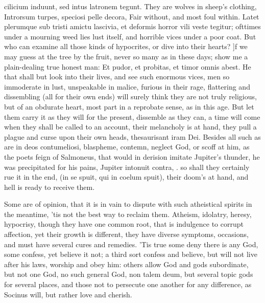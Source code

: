 {cilicium induunt, sed intus latronem tegunt. They are wolves in sheep's
clothing, Introrsum turpes, speciosi pelle decora, Fair without, and
most foul within. Latet plerumque sub tristi amictu lascivia, et
deformis horror vili veste tegitur; ofttimes under a mourning weed lies
lust itself, and horrible vices under a poor coat. But who can examine
all those kinds of hypocrites, or dive into their hearts? ]f we may
guess at the tree by the fruit, never so many as in these days; show me
a plain-dealing true honest man: Et pudor, et probitas, et timor omnis
abest. He that shall but look into their lives, and see such enormous
vices, men so immoderate in lust, unspeakable in malice, furious in
their rage, flattering and dissembling (all for their own ends) will
surely think they are not truly religious, but of an obdurate heart,
most part in a reprobate sense, as in this age. But let them carry it
as they will for the present, dissemble as they can, a time will come
when they shall be called to an account, their melancholy is at hand,
they pull a plague and curse upon their own heads, thesaurisant iram
Dei. Besides all such as are in deos contumeliosi, blaspheme, contemn,
neglect God, or scoff at him, as the poets feign of Salmoneus, that
would in derision imitate Jupiter's thunder, he was precipitated for
his pains, Jupiter intonuit contra, \etc{}. so shall they certainly rue it
in the end, (in se spuit, qui in coelum spuit), their doom's at
hand, and hell is ready to receive them.

Some are of opinion, that it is in vain to dispute with such
atheistical spirits in the meantime, 'tis not the best way to reclaim
them. Atheism, idolatry, heresy, hypocrisy, though they have one common
root, that is indulgence to corrupt affection, yet their growth is
different, they have diverse symptoms, occasions, and must have several
cures and remedies. 'Tis true some deny there is any God, some confess,
yet believe it not; a third sort confess and believe, but will not live
after his laws, worship and obey him: others allow God and gods
subordinate, but not one God, no such general God, non talem deum, but
several topic gods for several places, and those not to persecute one
another for any difference, as Socinus will, but rather love and
cherish.

}
